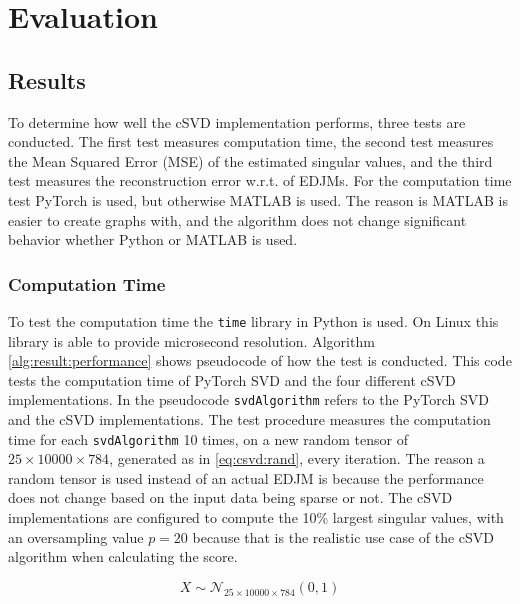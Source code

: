 \chapter{Evaluation}

\section{Results}

To determine how well the cSVD implementation performs, three tests are conducted. The first test measures computation time, the second test measures the Mean Squared Error (MSE) of the estimated singular values, and the third test measures the reconstruction error w.r.t. of EDJMs. For the computation time test PyTorch is used, but otherwise MATLAB is used. The reason is MATLAB is easier to create graphs with, and the algorithm does not change significant behavior whether Python or MATLAB is used.

\subsection*{Computation Time}

To test the computation time the \texttt{time} library in Python is used. On Linux this library is able to provide microsecond resolution. Algorithm \ref{alg:result:performance} shows pseudocode of how the test is conducted. This code tests the computation time of PyTorch SVD and the four different cSVD implementations. In the pseudocode \texttt{svdAlgorithm} refers to the PyTorch SVD and the cSVD implementations. The test procedure measures the computation time for each \texttt{svdAlgorithm} 10 times, on a new random tensor of $25 \times 10000 \times 784$, generated as in \eqref{eq:csvd:rand}, every iteration. The reason a random tensor is used instead of an actual EDJM is because the performance does not change based on the input data being sparse or not. The cSVD implementations are configured to compute the 10\% largest singular values, with an oversampling value $p=20$ because that is the realistic use case of the cSVD algorithm when calculating the score.

\begin{equation}
  \label{eq:csvd:rand}
  X \sim \mathcal{N}_{25 \times 10000 \times 784}(0, 1)
\end{equation}

$ $ \newline

